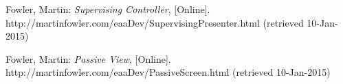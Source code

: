 \begin{thebibliography}{1}
Fowler, Martin: \emph{Supervising Controller},
[Online]. http://martinfowler.com/eaaDev/SupervisingPresenter.html (retrieved 10-Jan-2015)

Fowler, Martin: \emph{Passive View},
[Online]. http://martinfowler.com/eaaDev/PassiveScreen.html (retrieved 10-Jan-2015)



\end{thebibliography}